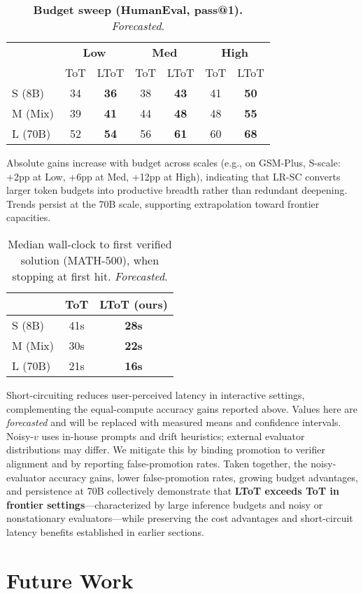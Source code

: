 \documentclass{article}
\begin{document}
\begin{table}[t]
\centering
\caption{\textbf{Budget sweep (HumanEval, pass@1).} \emph{Forecasted}.}
\vspace{0.3em}
\begin{tabular}{lcccccc}
\toprule
 & \multicolumn{2}{c}{\textbf{Low}} & \multicolumn{2}{c}{\textbf{Med}} & \multicolumn{2}{c}{\textbf{High}} \\
\cmidrule(lr){2-3}\cmidrule(lr){4-5}\cmidrule(lr){6-7}
 & ToT & LToT & ToT & LToT & ToT & LToT \\
\midrule
S (8B)  & 34 & \textbf{36} & 38 & \textbf{43} & 41 & \textbf{50} \\
M (Mix) & 39 & \textbf{41} & 44 & \textbf{48} & 48 & \textbf{55} \\
L (70B) & 52 & \textbf{54} & 56 & \textbf{61} & 60 & \textbf{68} \\
\bottomrule
\end{tabular}
\label{tab:budget-he}
\end{table}

Absolute gains increase with budget across scales (e.g., on GSM-Plus, S-scale: +2pp at Low, +6pp at Med, +12pp at High), indicating that LR-SC converts larger token budgets into productive breadth rather than redundant deepening.
Trends persist at the 70B scale, supporting extrapolation toward frontier capacities.

\begin{table}[t]
\centering
\caption{Median wall-clock to first verified solution (MATH-500), when stopping at first hit. \emph{Forecasted}.}
\vspace{0.3em}
\begin{tabular}{lcc}
\toprule
 & \textbf{ToT} & \textbf{LToT (ours)} \\
\midrule
S (8B)  & 41s & \textbf{28s} \\
M (Mix) & 30s & \textbf{22s} \\
L (70B) & 21s & \textbf{16s} \\
\bottomrule
\end{tabular}
\label{tab:latency}
\end{table}

Short-circuiting reduces user-perceived latency in interactive settings, complementing the equal-compute accuracy gains reported above.
Values here are \emph{forecasted} and will be replaced with measured means and confidence intervals.
Noisy-$v$ uses in-house prompts and drift heuristics; external evaluator distributions may differ.
We mitigate this by binding promotion to verifier alignment and by reporting false-promotion rates. Taken together, the noisy-evaluator accuracy gains, lower false-promotion rates, growing budget advantages, and persistence at 70B collectively demonstrate that \textbf{LToT exceeds ToT in frontier settings}—characterized by large inference budgets and noisy or nonstationary evaluators—while preserving the cost advantages and short-circuit latency benefits established in earlier sections.\section{Future Work}
\label{section:future-work}
\end{document}
